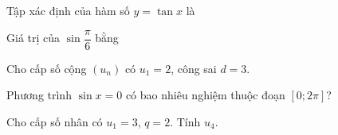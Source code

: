 \documentclass[12pt]{article}
\begin{document}
\taodaude

\phantn
\begin{tn}
Tập xác định của hàm số $y=\tan x$ là
\end{tn}
\begin{tn}
Giá trị của $\sin\dfrac{\pi}{6}$ bằng
\end{tn}

\phands
\begin{ds}
Cho cấp số cộng $(u_n)$ có $u_1=2$, công sai $d=3$.
\end{ds}

\phantln
\begin{tln}
Phương trình $\sin x=0$ có bao nhiêu nghiệm thuộc đoạn $[0;2\pi]$?
\end{tln}
\begin{tln}
Cho cấp số nhân có $u_1=3$, $q=2$. Tính $u_4$.
\end{tln}

\hetde
\newpage
\bangdapan
\end{document}
